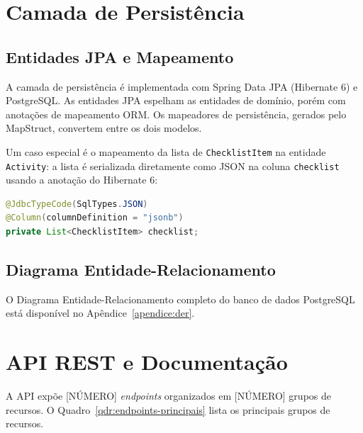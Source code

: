 \section{Camada de Persistência}
\label{sec:persistencia}

\subsection{Entidades JPA e Mapeamento}
\label{subsec:entidades-jpa}

A camada de persistência é implementada com Spring Data JPA (Hibernate 6) e
PostgreSQL. As entidades JPA espelham as entidades de domínio, porém com anotações
de mapeamento ORM. Os mapeadores de persistência, gerados pelo MapStruct, convertem
entre os dois modelos.

Um caso especial é o mapeamento da lista de \texttt{ChecklistItem} na entidade
\texttt{Activity}: a lista é serializada diretamente como JSON na coluna
\texttt{checklist} usando a anotação do Hibernate 6:

\begin{lstlisting}[language=Java, caption={Mapeamento JSON de ChecklistItem},label={lst:json-mapping}]
@JdbcTypeCode(SqlTypes.JSON)
@Column(columnDefinition = "jsonb")
private List<ChecklistItem> checklist;
\end{lstlisting}

\subsection{Diagrama Entidade-Relacionamento}
\label{subsec:der}

O Diagrama Entidade-Relacionamento completo do banco de dados PostgreSQL está
disponível no Apêndice~\ref{apendice:der}.

\section{API REST e Documentação}
\label{sec:api-rest}

A API expõe [NÚMERO] \textit{endpoints} organizados em [NÚMERO] grupos de recursos.
O Quadro~\ref{qdr:endpoints-principais} lista os principais grupos de recursos.

